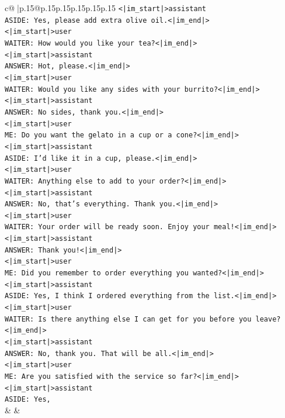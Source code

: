 \documentclass{article}
\begin{document}
{\begin{supertabular}{c@{$\;$}|p{.15\linewidth}@{}p{.15\linewidth}p{.15\linewidth}p{.15\linewidth}p{.15\linewidth}p{.15\linewidth}}
{{{\texttt{<|im\_start|>assistant} \\
\texttt{ASIDE: Yes, please add extra olive oil.<|im\_end|>} \\
\texttt{<|im\_start|>user} \\
\texttt{WAITER: How would you like your tea?<|im\_end|>} \\
\texttt{<|im\_start|>assistant} \\
\texttt{ANSWER: Hot, please.<|im\_end|>} \\
\texttt{<|im\_start|>user} \\
\texttt{WAITER: Would you like any sides with your burrito?<|im\_end|>} \\
\texttt{<|im\_start|>assistant} \\
\texttt{ANSWER: No sides, thank you.<|im\_end|>} \\
\texttt{<|im\_start|>user} \\
\texttt{ME: Do you want the gelato in a cup or a cone?<|im\_end|>} \\
\texttt{<|im\_start|>assistant} \\
\texttt{ASIDE: I'd like it in a cup, please.<|im\_end|>} \\
\texttt{<|im\_start|>user} \\
\texttt{WAITER: Anything else to add to your order?<|im\_end|>} \\
\texttt{<|im\_start|>assistant} \\
\texttt{ANSWER: No, that's everything. Thank you.<|im\_end|>} \\
\texttt{<|im\_start|>user} \\
\texttt{WAITER: Your order will be ready soon. Enjoy your meal!<|im\_end|>} \\
\texttt{<|im\_start|>assistant} \\
\texttt{ANSWER: Thank you!<|im\_end|>} \\
\texttt{<|im\_start|>user} \\
\texttt{ME: Did you remember to order everything you wanted?<|im\_end|>} \\
\texttt{<|im\_start|>assistant} \\
\texttt{ASIDE: Yes, I think I ordered everything from the list.<|im\_end|>} \\
\texttt{<|im\_start|>user} \\
\texttt{WAITER: Is there anything else I can get for you before you leave?<|im\_end|>} \\
\texttt{<|im\_start|>assistant} \\
\texttt{ANSWER: No, thank you. That will be all.<|im\_end|>} \\
\texttt{<|im\_start|>user} \\
\texttt{ME: Are you satisfied with the service so far?<|im\_end|>} \\
\texttt{<|im\_start|>assistant} \\
\texttt{ASIDE: Yes,} \\
            }
        }
    }
    & & \\ \\


\end{supertabular}}
\end{document}
